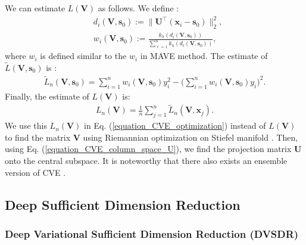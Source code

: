 \documentclass[lang=cn,10pt]{gorgeousnbook}
\numberwithin{equation}{section}%
\numberwithin{figure}{section}%
\begin{document}
We can estimate $L(\boldsymbol{V})$ as follows. We define \cite{fertl2021conditional}:
\begin{align*}
& d_i(\boldsymbol{V}, \boldsymbol{s}_0) := \|\boldsymbol{U}^\top (\boldsymbol{x}_i - \boldsymbol{s}_0)\|_2^2, \\
& w_i(\boldsymbol{V}, \boldsymbol{s}_0) := \frac{k_h(d_i(\boldsymbol{V}, \boldsymbol{s}_0))}{\sum_{\ell=1}^n k_h(d_\ell(\boldsymbol{V}, \boldsymbol{s}_0))}, 
\end{align*}
where $w_i$ is defined similar to the $w_i$ in MAVE method. 
The estimate of $\widetilde{L}(\boldsymbol{V}, \boldsymbol{s}_0)$ is \cite{fertl2021conditional}:
\begin{align*}
\widetilde{L}_n(\boldsymbol{V}, \boldsymbol{s}_0) = \sum_{i=1}^n w_i(\boldsymbol{V}, \boldsymbol{s}_0) y_i^2 - \Big(\sum_{i=1}^n w_i(\boldsymbol{V}, \boldsymbol{s}_0) y_i\Big)^2.
\end{align*}
Finally, the estimate of $L(\boldsymbol{V})$ is:
\begin{align*}
L_n(\boldsymbol{V}) = \frac{1}{n} \sum_{j=1}^n \widetilde{L}_n(\boldsymbol{V}, \boldsymbol{x}_j). 
\end{align*}
We use this $L_n(\boldsymbol{V})$ in Eq. (\ref{equation_CVE_optimization}) instead of $L(\boldsymbol{V})$ to find the matrix $\boldsymbol{V}$ using Riemannian optimization on Stiefel manifold \cite{absil2009optimization}. 
Then, using Eq. (\ref{equation_CVE_column_space_U}), we find the projection matrix $\boldsymbol{U}$ onto the central subspace. 
It is noteworthy that there also exists an ensemble version of CVE \cite{fertl2021ensemble}.

\subsection{Deep Sufficient Dimension Reduction}\label{section_deep_SDR}

\subsubsection{Deep Variational Sufficient Dimension Reduction (DVSDR)}
\end{document}
